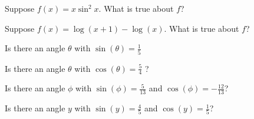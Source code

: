 \documentclass{ximera}
\begin{document}
\begin{problem}
  Suppose $f(x) = x \sin^2 x$.  What is true about $f$?
  \begin{multipleChoice}
  \end{multipleChoice}
\end{problem}

\begin{problem}
  Suppose $f(x) = \log(x+1) - \log(x)$.  What is true about $f$?
  \begin{multipleChoice}
  \end{multipleChoice}
\end{problem}

\begin{problem}
  Is there an angle $\theta$ with $\sin(\theta) = \frac{1}{5}$
  \begin{multipleChoice}
  \end{multipleChoice}
\end{problem}

\begin{problem}
  Is there an angle $\theta$ with $\cos(\theta) = \frac{5}{4}$ ?
  \begin{multipleChoice}
  \end{multipleChoice}
\end{problem}

\begin{problem}
  Is there an angle $\phi$ with $\sin(\phi) = \frac{5}{13}$ and $\cos(\phi) = -\frac{12}{13}$?
  \begin{multipleChoice}
  \end{multipleChoice}
\end{problem}

\begin{problem}
  Is there an angle $y$ with $\sin(y) = \frac{4}{5}$ and $\cos(y) = \frac{1}{5}$?
  \begin{multipleChoice}
  \end{multipleChoice}
\end{problem}
\end{document}
